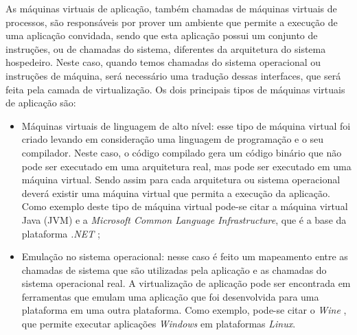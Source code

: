 As máquinas virtuais de aplicação, também chamadas de máquinas virtuais de processos, são responsáveis por prover um ambiente que permite 
a execução de uma aplicação convidada, sendo que esta aplicação possui um conjunto de instruções, ou de chamadas do sistema, diferentes da 
arquitetura do sistema hospedeiro. Neste caso, quando temos chamadas do sistema operacional ou instruções de máquina, será necessário uma 
tradução dessas interfaces, que será feita pela camada de virtualização. Os dois principais tipos de máquinas virtuais de aplicação são:

\begin{itemize}
 \item Máquinas virtuais de linguagem de alto nível: esse tipo de máquina virtual foi criado levando em consideração uma linguagem de 
 programação e o seu compilador. Neste caso, o código compilado gera um código binário que não pode ser executado em uma arquitetura real, 
 mas pode ser executado em uma máquina virtual. Sendo assim para cada arquitetura ou sistema operacional deverá existir uma máquina virtual que
 permita a execução da aplicação. Como exemplo deste tipo de máquina virtual pode-se citar a máquina virtual Java (\ac{JVM})
 e a \textit{Microsoft Common Language Infrastructure}, que é a base da plataforma \textit{.NET} \cite{carissimi2008};
 \item Emulação no sistema operacional: nesse caso é feito um mapeamento entre as chamadas de sistema que são utilizadas pela aplicação 
 e as chamadas do sistema operacional real. A virtualização de aplicação pode ser encontrada em ferramentas que emulam uma aplicação que foi
 desenvolvida para uma plataforma em uma outra plataforma. Como exemplo, pode-se citar o \textit{Wine} \cite{wine}, que permite executar 
 aplicações \textit{Windows} em plataformas \textit{Linux}.
\end{itemize}


